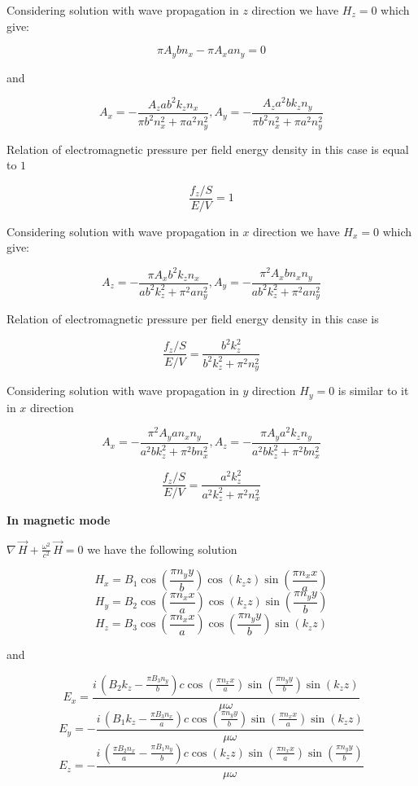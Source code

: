 \documentclass[twoside, 10pt]{article}
\begin{document}
\begin{multicols}{2}

    Considering solution with wave propagation in \(z\) direction we have
\(H_z = 0\) which give:

    \[\pi A_{y} b n_{x} - \pi A_{x} a n_{y} = 0\]

    and

\[A_{x} = -\frac{A_{z} a b^{2} k_{z} n_{x}}{\pi b^{2} n_{x}^{2} + \pi a^{2} n_{y}^{2}},
A_{y} = -\frac{A_{z} a^{2} b k_{z} n_{y}}{\pi b^{2} n_{x}^{2} + \pi a^{2} n_{y}^{2}}\]

    Relation of electromagnetic pressure per field energy density in this
case is equal to \(1\)

\[\frac{f_z/S}{E/V} = 1\]

    Considering solution with wave propagation in \(x\) direction we have
\(H_x = 0\) which give:

    \[A_{z} = -\frac{\pi A_{x} b^{2} k_{z} n_{x}}{a b^{2} k_{z}^{2} + \pi^{2} a n_{y}^{2}},
A_{y} = -\frac{\pi^{2} A_{x} b n_{x} n_{y}}{a b^{2} k_{z}^{2} + \pi^{2} a n_{y}^{2}}\]

    Relation of electromagnetic pressure per field energy density in this
case is

\[\frac{f_z/S}{E/V} = \frac{b^{2} k_{z}^{2}}{b^{2} k_{z}^{2} + \pi^{2} n_{y}^{2}}\]

    Considering solution with wave propagation in \(y\) direction
\(H_y = 0\) is similar to it in \(x\) direction

\[A_{x} = -\frac{\pi^{2} A_{y} a n_{x} n_{y}}{a^{2} b k_{z}^{2} + \pi^{2} b n_{x}^{2}},
A_{z} = -\frac{\pi A_{y} a^{2} k_{z} n_{y}}{a^{2} b k_{z}^{2} + \pi^{2} b n_{x}^{2}}\]

\[\frac{f_z/S}{E/V} = \frac{a^{2} k_{z}^{2}}{a^{2} k_{z}^{2} + \pi^{2} n_{x}^{2}}\]

    \textbf{In magnetic mode}

\(\nabla\,\vec{H} + \frac{\omega^2}{c^2}\,\vec{H} = 0\) we have the
following solution

    \[H_{x} = B_{1} \cos\left(\frac{\pi n_{y} y}{b}\right) \cos\left(k_{z} z\right) \sin\left(\frac{\pi n_{x} x}{a}\right)\]
\[H_{y} = B_{2} \cos\left(\frac{\pi n_{x} x}{a}\right) \cos\left(k_{z} z\right) \sin\left(\frac{\pi n_{y} y}{b}\right)\]
\[H_{z} = B_{3} \cos\left(\frac{\pi n_{x} x}{a}\right) \cos\left(\frac{\pi n_{y} y}{b}\right) \sin\left(k_{z} z\right)\]

    and

\[E_{x} = \frac{i \, {\left(B_{2} k_{z} - \frac{\pi B_{3} n_{y}}{b}\right)} c \cos\left(\frac{\pi n_{x} x}{a}\right) \sin\left(\frac{\pi n_{y} y}{b}\right) \sin\left(k_{z} z\right)}{\mu \omega}\]
\[E_{y} = -\frac{i \, {\left(B_{1} k_{z} - \frac{\pi B_{3} n_{x}}{a}\right)} c \cos\left(\frac{\pi n_{y} y}{b}\right) \sin\left(\frac{\pi n_{x} x}{a}\right) \sin\left(k_{z} z\right)}{\mu \omega}\]
\[E_{z} = -\frac{i \, {\left(\frac{\pi B_{2} n_{x}}{a} - \frac{\pi B_{1} n_{y}}{b}\right)} c \cos\left(k_{z} z\right) \sin\left(\frac{\pi n_{x} x}{a}\right) \sin\left(\frac{\pi n_{y} y}{b}\right)}{\mu \omega}\]


\end{multicols}
\end{document}
